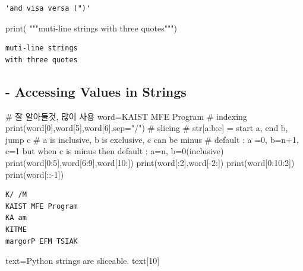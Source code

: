 \documentclass[
  letterpaper,
  DIV=11,
  numbers=noendperiod]{scrreprt}
\newenvironment{Shaded}{\begin{snugshade}}{\end{snugshade}}
\newcommand{\BuiltInTok}[1]{\textcolor[rgb]{0.00,0.23,0.31}{#1}}
\newcommand{\CommentTok}[1]{\textcolor[rgb]{0.37,0.37,0.37}{#1}}
\newcommand{\DecValTok}[1]{\textcolor[rgb]{0.68,0.00,0.00}{#1}}
\newcommand{\NormalTok}[1]{\textcolor[rgb]{0.00,0.23,0.31}{#1}}
\newcommand{\OperatorTok}[1]{\textcolor[rgb]{0.37,0.37,0.37}{#1}}
\newcommand{\StringTok}[1]{\textcolor[rgb]{0.13,0.47,0.30}{#1}}
\begin{document}
\begin{verbatim}
'and visa versa (")'
\end{verbatim}

\begin{Shaded}
\begin{Highlighting}[]
\BuiltInTok{print}\NormalTok{(}
\StringTok{"""muti{-}line strings}
\StringTok{with three quotes"""}\NormalTok{)}
\end{Highlighting}
\end{Shaded}

\begin{verbatim}
muti-line strings
with three quotes
\end{verbatim}

\subsection{- Accessing Values in
Strings}\label{accessing-values-in-strings}

\begin{Shaded}
\begin{Highlighting}[]
\CommentTok{\# 잘 알아둘것, 많이 사용}
\NormalTok{word}\OperatorTok{=}\StringTok{\textquotesingle{}KAIST MFE Program\textquotesingle{}}
\CommentTok{\# indexing}
\BuiltInTok{print}\NormalTok{(word[}\DecValTok{0}\NormalTok{],word[}\DecValTok{5}\NormalTok{],word[}\DecValTok{6}\NormalTok{],sep}\OperatorTok{=}\StringTok{"/"}\NormalTok{)}
\CommentTok{\# slicing}
\CommentTok{\# str[a:b:c] = start a, end b, jump c}
\CommentTok{\# a is inclusive, b is exclusive, c can be minus}
\CommentTok{\# default : a =0, b=n+1, c=1 but when c is minus then default : a=n, b=0(inclusive)}
\BuiltInTok{print}\NormalTok{(word[}\DecValTok{0}\NormalTok{:}\DecValTok{5}\NormalTok{],word[}\DecValTok{6}\NormalTok{:}\DecValTok{9}\NormalTok{],word[}\DecValTok{10}\NormalTok{:])}
\BuiltInTok{print}\NormalTok{(word[:}\DecValTok{2}\NormalTok{],word[}\OperatorTok{{-}}\DecValTok{2}\NormalTok{:])}
\BuiltInTok{print}\NormalTok{(word[}\DecValTok{0}\NormalTok{:}\DecValTok{10}\NormalTok{:}\DecValTok{2}\NormalTok{])}
\BuiltInTok{print}\NormalTok{(word[::}\OperatorTok{{-}}\DecValTok{1}\NormalTok{])}
\end{Highlighting}
\end{Shaded}

\begin{verbatim}
K/ /M
KAIST MFE Program
KA am
KITME
margorP EFM TSIAK
\end{verbatim}

\begin{Shaded}
\begin{Highlighting}[]
\NormalTok{text}\OperatorTok{=}\StringTok{\textquotesingle{}Python strings are sliceable.\textquotesingle{}}
\NormalTok{text[}\DecValTok{10}\NormalTok{]}
\end{Highlighting}
\end{Shaded}
\end{document}
